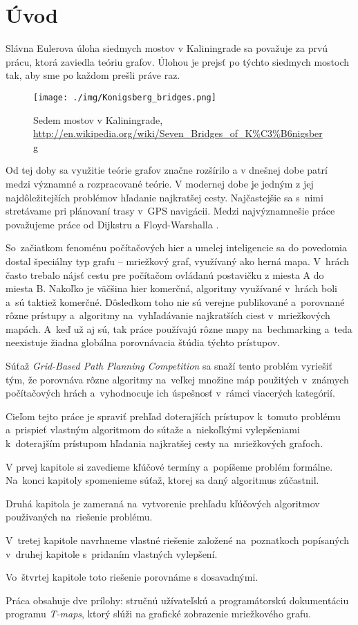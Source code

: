 \chapter*{Úvod}

Slávna Eulerova úloha siedmych mostov v Kaliningrade \cite{euler41} sa považuje za prvú prácu, 
ktorá zaviedla teóriu grafov.
Úlohou je prejsť po týchto siedmych mostoch tak, aby sme po každom prešli práve raz.


\begin{figure}[h]
\centering
\texttt{[image: ./img/Konigsberg\_bridges.png]}
\caption{Sedem mostov v Kaliningrade, \url{http://en.wikipedia.org/wiki/Seven_Bridges_of_K\%C3\%B6nigsberg}}
\label{fig:konigsberg_bridges}
\end{figure}

 
Od tej doby sa využitie teórie grafov značne
rozšírilo a v dnešnej dobe patrí medzi významné
a rozpracované teórie. V modernej dobe je jedným z jej 
naj\-dô\-le\-ži\-tej\-ších 
problémov hľadanie najkratšej cesty. Najčastejšie sa s~nimi stretávame pri plánovaní trasy v~GPS navigácii.
Medzi najvýznamnešie práce považujeme práce od Dijkstru \cite{dijkstra59} a Floyd-Warshalla \cite{floyd62}.

So~začiatkom fenoménu počítačových hier 
a umelej inteligencie sa do povedomia dostal špeciálny typ grafu --
mriežkový graf, využívaný ako herná mapa.
V~hrách často trebalo nájsť cestu pre počítačom
ovládanú postavičku z miesta A do miesta B.
Nakoľko je väčšina hier komerčná, algoritmy
využívané v~hrách boli a~sú taktiež komerčné.
Dôsledkom toho nie sú verejne publikované a~porovnané rôzne prístupy a~algoritmy
na~vyhľadávanie najkratších ciest v~mriežkových mapách. A~keď už aj sú, tak práce používajú rôzne mapy
na~bechmarking a~teda neexistuje žiadna globálna porovnávacia štúdia týchto prístupov.

Súťaž {\sl Grid-Based Path Planning Competition}
 \cite{sturtevantgppc} sa snaží tento problém vyriešiť tým, že porovnáva rôzne algoritmy na~veľkej množine máp
použitých v~známych počítačových hrách a~vyhodnocuje ich úspešnosť v~rámci viacerých kategórií.

Cieľom tejto práce je spraviť prehľad doterajších prístupov k~tomuto problému a~prispieť vlastným algoritmom do sútaže a~niekoľkými vylepšeniami k~doterajším prístupom hľadania najkratšej cesty na~mriežkových grafoch.

V prvej kapitole si zavedieme kľúčové termíny a~popíšeme problém formálne. Na~konci kapitoly spomenieme súťaž, ktorej sa daný algoritmus zúčastnil.

Druhá kapitola je zameraná na~vytvorenie prehľadu kľúčových algoritmov použivaných na~riešenie problému.

V~tretej kapitole navrhneme vlastné riešenie založené na~poznatkoch popísaných v~druhej kapitole s~pridaním vlastných vylepšení.

Vo~štvrtej kapitole toto riešenie porovnáme s dosavadnými.

Práca obsahuje dve prílohy: stručnú užívateľskú a programátorskú dokumentáciu programu \emph{T-maps}, ktorý slúži na grafické zobrazenie mriežkového grafu.

